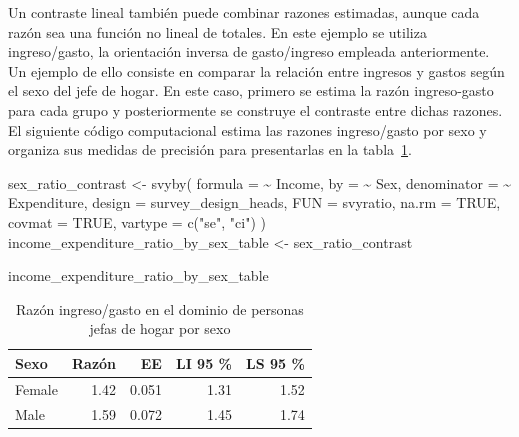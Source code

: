 \documentclass[
  spanish,
  11pt,
  letterpaper,
  oneside,
  open=any]{scrbook}
\newenvironment{Shaded}{\begin{snugshade}}{\end{snugshade}}
\newcommand{\AttributeTok}[1]{\textcolor[rgb]{0.40,0.45,0.13}{#1}}
\newcommand{\ConstantTok}[1]{\textcolor[rgb]{0.56,0.35,0.01}{#1}}
\newcommand{\FunctionTok}[1]{\textcolor[rgb]{0.28,0.35,0.67}{#1}}
\newcommand{\NormalTok}[1]{\textcolor[rgb]{0.00,0.23,0.31}{#1}}
\newcommand{\OtherTok}[1]{\textcolor[rgb]{0.00,0.23,0.31}{#1}}
\newcommand{\SpecialCharTok}[1]{\textcolor[rgb]{0.37,0.37,0.37}{#1}}
\newcommand{\StringTok}[1]{\textcolor[rgb]{0.13,0.47,0.30}{#1}}
\begin{document}
Un contraste lineal también puede combinar razones estimadas, aunque
cada razón sea una función no lineal de totales. En este ejemplo se
utiliza ingreso/gasto, la orientación inversa de gasto/ingreso empleada
anteriormente. Un ejemplo de ello consiste en comparar la relación entre
ingresos y gastos según el sexo del jefe de hogar. En este caso, primero
se estima la razón ingreso-gasto para cada grupo y posteriormente se
construye el contraste entre dichas razones. El siguiente código
computacional estima las razones ingreso/gasto por sexo y organiza sus
medidas de precisión para presentarlas en la
tabla~\ref{tbl-razon-ingreso-gasto-sexo}.

\begin{Shaded}
\begin{Highlighting}[]
\NormalTok{sex\_ratio\_contrast }\OtherTok{\textless{}{-}} \FunctionTok{svyby}\NormalTok{(}
  \AttributeTok{formula =} \SpecialCharTok{\textasciitilde{}}\NormalTok{ Income,}
  \AttributeTok{by =} \SpecialCharTok{\textasciitilde{}}\NormalTok{ Sex,}
  \AttributeTok{denominator =} \SpecialCharTok{\textasciitilde{}}\NormalTok{ Expenditure,}
  \AttributeTok{design =}\NormalTok{ survey\_design\_heads,}
  \AttributeTok{FUN =}\NormalTok{ svyratio,}
  \AttributeTok{na.rm =} \ConstantTok{TRUE}\NormalTok{,}
  \AttributeTok{covmat =} \ConstantTok{TRUE}\NormalTok{,}
  \AttributeTok{vartype =} \FunctionTok{c}\NormalTok{(}\StringTok{"se"}\NormalTok{, }\StringTok{"ci"}\NormalTok{)}
\NormalTok{)}
\NormalTok{income\_expenditure\_ratio\_by\_sex\_table }\OtherTok{\textless{}{-}}\NormalTok{ sex\_ratio\_contrast}

\NormalTok{income\_expenditure\_ratio\_by\_sex\_table}
\end{Highlighting}
\end{Shaded}

{

\begin{longtable}[]{@{}lrrrr@{}}

\caption{\label{tbl-razon-ingreso-gasto-sexo}Razón ingreso/gasto en el
dominio de personas jefas de hogar por sexo}

\tabularnewline

\toprule\noalign{}
Sexo & Razón & EE & LI 95 \% & LS 95 \% \\
\midrule\noalign{}
\endhead
\bottomrule\noalign{}
\endlastfoot
Female & 1.42 & 0.051 & 1.31 & 1.52 \\
Male & 1.59 & 0.072 & 1.45 & 1.74 \\

\end{longtable}

}
\end{document}
